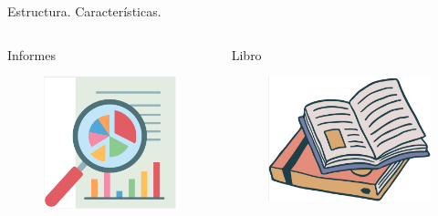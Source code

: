\documentclass[aspectratio=169, 10pt]{beamer}
\begin{document}
\begin{frame}{Estructura. Características.}
\begin{itemize}
\begin{columns}
    \begin{column}{.16\linewidth}
    \centering
    Informes
    \begin{figure}[H]
        \centering
        \includegraphics[scale=.1]{informe.png} 
    \end{figure}
    \end{column} \pause

    \begin{column}{.16\linewidth}
    \centering
    Libro
    \begin{figure}
        \centering
        \includegraphics[scale=.1]{libro.png} 
        \label{fig:enter-label}
    \end{figure}
    \end{column} \pause
    

\end{columns}
\end{itemize}
\end{frame}
\end{document}
